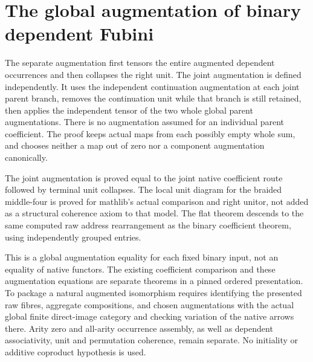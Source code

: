 \documentclass{article}
\begin{document}
\section*{The global augmentation of binary dependent Fubini}
The separate augmentation first tensors the entire augmented dependent
occurrences and then collapses the right unit. The joint augmentation is
defined independently. It uses the independent continuation augmentation
at each joint parent branch, removes the continuation unit while that
branch is still retained, then applies the independent tensor of the two
whole global parent augmentations. There is no augmentation assumed for
an individual parent coefficient. The proof keeps actual maps from each
possibly empty whole sum, and chooses neither a map out of zero nor
a component augmentation canonically.

The joint augmentation is proved equal to the joint native coefficient
route followed by terminal unit collapses. The local unit diagram for
the braided middle-four is proved for mathlib's actual comparison and
right unitor, not added as a structural coherence axiom to that model.
The flat theorem descends to the same computed raw address rearrangement
as the binary coefficient theorem, using independently grouped entries.

This is a global augmentation equality for each fixed binary input,
not an equality of native functors. The existing coefficient comparison
and these augmentation equations are separate theorems in a pinned
ordered presentation. To package a natural augmented isomorphism requires
identifying the presented raw fibres, aggregate compositions, and chosen
augmentations with the actual global finite direct-image category and
checking variation of the native arrows there. Arity zero and all-arity
occurrence assembly, as well as dependent associativity, unit and
permutation coherence, remain separate. No initiality or additive
coproduct hypothesis is used.
\end{document}
